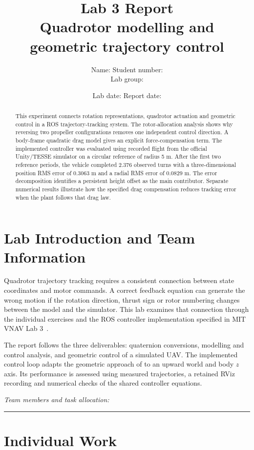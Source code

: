 \documentclass[12pt,a4paper,twoside]{article}
\title{Lab 3 Report\\[0.3em]\large Quadrotor modelling and geometric trajectory control}
\author{\small Name: \studentname\quad Student number: \studentnumber\\[0.6em]\small Lab group: \labgroup}
\date{\small Lab date: \labdate\quad Report date: \reportdate}
\renewcommand{\abstractname}{Summary}
\begin{document}
\renewcommand{\abstractname}{Summary}
\maketitle
\begin{abstract}
This experiment connects rotation representations, quadrotor actuation and geometric control in a ROS trajectory-tracking system. The rotor-allocation analysis shows why reversing two propeller configurations removes one independent control direction. A body-frame quadratic drag model gives an explicit force-compensation term. The implemented controller was evaluated using recorded flight from the official Unity/TESSE simulator on a circular reference of radius 5 m. After the first two reference periods, the vehicle completed 2.376 observed turns with a three-dimensional position RMS error of 0.3063 m and a radial RMS error of 0.0829 m. The error decomposition identifies a persistent height offset as the main contributor. Separate numerical results illustrate how the specified drag compensation reduces tracking error when the plant follows that drag law.
\end{abstract}

\section{Lab Introduction and Team Information}
Quadrotor trajectory tracking requires a consistent connection between state coordinates and motor commands. A correct feedback equation can generate the wrong motion if the rotation direction, thrust sign or rotor numbering changes between the model and the simulator. This lab examines that connection through the individual exercises and the ROS controller implementation specified in MIT VNAV Lab 3~\citep{vnav}.

The report follows the three deliverables: quaternion conversions, modelling and control analysis, and geometric control of a simulated UAV. The implemented control loop adapts the geometric approach of \citet{lee2010} to an upward world and body $z$ axis. Its performance is assessed using measured trajectories, a retained RViz recording and numerical checks of the shared controller equations.

\textit{Team members and task allocation:}\quad\rule{62mm}{0.3pt}

\clearpage
\section{Individual Work}
\end{document}

